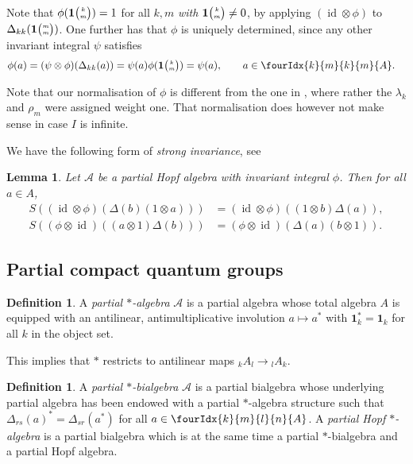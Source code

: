 \documentclass[10pt]{article}
\DeclareMathOperator{\id}{id}
\newcommand{\GrDA}[3]{{}_{#2}#1_{#3}} %
\newcommand{\Grt}[3]{#1{\tiny {\begin{pmatrix} #2\\#3\end{pmatrix}}}}
\newcommand{\UnitC}[2]{\Grt{\mathbf{1}}{#1}{#2}}
\newcommand{\Gr}[5]{\fourIdx{#2}{#4}{#3}{#5}{#1}}%
\newtheorem{Lem}[Theorem]{Lemma}
\theoremstyle{definition}
\newtheorem{Def}[Theorem]{Definition}
\numberwithin{equation}{section}
\begin{document}
Note that $\phi(\UnitC{k}{m})=1$ for all $k,m$ \emph{with $\UnitC{k}{m}\neq 0$}, by applying $(\id\otimes \phi)$ to $\Delta_{kk}(\UnitC{m}{m})$. One further has that $\phi$ is uniquely determined, since any other invariant integral $\psi$ satisfies \begin{align*}  \phi(a)  &= (\psi \otimes
      \phi)(\Delta_{kk}(a)) = \psi(a)\phi(\UnitC{k}{m}) = \psi(a),\qquad a\in \Gr{A}{k}{k}{m}{m}.
    \end{align*}

Note that our normalisation of $\phi$ is different from the one in \cite{Hay1}, where rather the $\lambda_k$ and $\rho_m$ were assigned weight one. That normalisation does however not make sense in case $I$ is infinite.

We have the following form of \emph{strong invariance}, see \cite[Lemma 3.4]{Hay1}

\begin{Lem} \label{lemma:strong-invariance}
  Let $\mathscr{A}$ be a partial Hopf algebra with invariant integral $\phi$. Then
  for all $a\in A$,
  \begin{align*}
    S\left(( \id\otimes
    \phi)(\Delta(b)(1 \otimes a))\right) &= (\id \otimes \phi)((1 \otimes b)\Delta(a)),\\  S\left((\phi \otimes
    \id)((a\otimes 1)\Delta(b))\right) &= (\phi \otimes \id)(\Delta(a)(b\otimes 1)).\end{align*}
\end{Lem}



\subsection{Partial compact quantum groups}
 
\begin{Def} A \emph{partial $*$-algebra} $\mathscr{A}$ is a partial
  algebra whose total algebra $A$ is equipped with an antilinear,
  antimultiplicative involution $ a\mapsto
  a^*$ with $\mathbf{1}_k^*=\mathbf{1}_k$ for all $k$ in
  the object set. 
\end{Def} 

This implies that $*$ restricts to antilinear maps $\GrDA{A}{k}{l}\rightarrow \GrDA{A}{l}{k}$.

\begin{Def} A \emph{partial $*$-bialgebra} $\mathscr{A}$ is a
 partial bialgebra whose underlying partial algebra has been
  endowed with a partial $*$-algebra structure such that
$\Delta_{rs}(a)^* = \Delta_{sr}(a^*)$ for all $a \in \Gr{A}{k}{l}{m}{n}$.
A \emph{partial Hopf $*$-algebra} is a partial bialgebra which is at the same time a partial $*$-bialgebra and a partial Hopf algebra.
\end{Def} 
\end{document}
